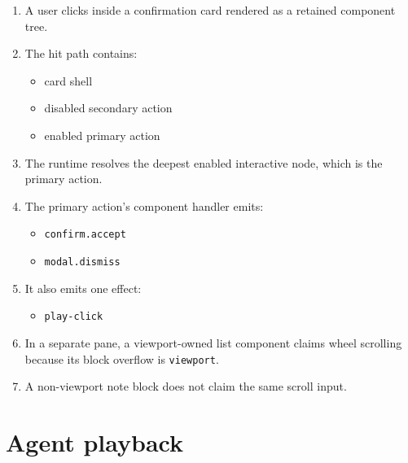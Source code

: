 \begin{enumerate}
\def\labelenumi{\arabic{enumi}.}
\tightlist
\item
  A user clicks inside a confirmation card rendered as a retained component tree.
\item
  The hit path contains:

  \begin{itemize}
  \tightlist
  \item
    card shell
  \item
    disabled secondary action
  \item
    enabled primary action
  \end{itemize}
\item
  The runtime resolves the deepest enabled interactive node, which is the primary action.
\item
  The primary action's component handler emits:

  \begin{itemize}
  \tightlist
  \item
    \texttt{c\allowbreak{}o\allowbreak{}n\allowbreak{}f\allowbreak{}i\allowbreak{}r\allowbreak{}m\allowbreak{}.\allowbreak{}a\allowbreak{}c\allowbreak{}c\allowbreak{}e\allowbreak{}p\allowbreak{}t}
  \item
    \texttt{m\allowbreak{}o\allowbreak{}d\allowbreak{}a\allowbreak{}l\allowbreak{}.\allowbreak{}d\allowbreak{}i\allowbreak{}s\allowbreak{}m\allowbreak{}i\allowbreak{}s\allowbreak{}s}
  \end{itemize}
\item
  It also emits one effect:

  \begin{itemize}
  \tightlist
  \item
    \texttt{p\allowbreak{}l\allowbreak{}a\allowbreak{}y\allowbreak{}-\allowbreak{}c\allowbreak{}l\allowbreak{}i\allowbreak{}c\allowbreak{}k}
  \end{itemize}
\item
  In a separate pane, a viewport-owned list component claims wheel scrolling because its block overflow is \texttt{v\allowbreak{}i\allowbreak{}e\allowbreak{}w\allowbreak{}p\allowbreak{}o\allowbreak{}r\allowbreak{}t}.
\item
  A non-viewport note block does not claim the same scroll input.
\end{enumerate}

\section{Agent playback}\label{record-154-agent-playback}

